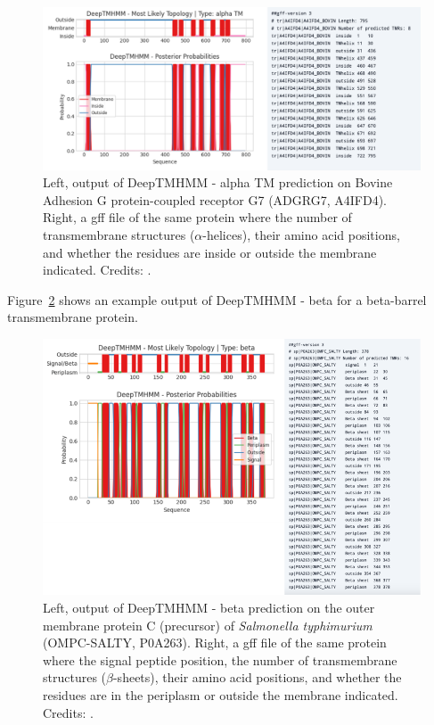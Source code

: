 \begin{figure}[!htbp]
\centering
\includegraphics[width=0.8\linewidth]{files/alphatm-e02c98cd2ec1e872c9c5cc8f2ea43b40.png}
\caption[]{Left, output of DeepTMHMM - alpha TM prediction on Bovine Adhesion G protein-coupled receptor G7 (ADGRG7, A4IFD4).
Right, a gff file of the same protein where the number of transmembrane structures ($\alpha$-helices), their amino acid positions, and whether the residues are inside or outside the membrane indicated.
Credits: \cite{deeptmhmm_2022}.}
\label{alphatm}
\end{figure}

Figure~\ref{betatm} shows an example output of DeepTMHMM - beta for a beta-barrel transmembrane protein.

\begin{figure}[!htbp]
\centering
\includegraphics[width=0.8\linewidth]{files/betatm-93a2bd80846c7b2bf75d8448c7afbdfd.png}
\caption[]{Left, output of DeepTMHMM - beta prediction on the outer membrane protein C (precursor) of \textit{Salmonella typhimurium} (OMPC-SALTY, P0A263).
Right, a gff file of the same protein where the signal peptide position, the number of transmembrane structures ($\beta$-sheets), their amino acid positions, and whether the residues are in the periplasm or outside the membrane indicated.
Credits: \cite{deeptmhmm_2022}.}
\label{betatm}
\end{figure}


